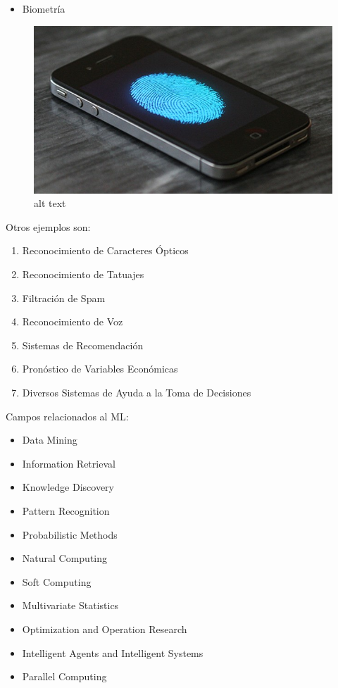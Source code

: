 \documentclass[11pt]{article}
\makeatletter
\def\maxwidth{\ifdim\Gin@nat@width>\linewidth\linewidth
    \else\Gin@nat@width\fi}
\let\Oldincludegraphics\includegraphics
\renewcommand{\includegraphics}[1]{\Oldincludegraphics[width=.8\maxwidth]{#1}}
\providecommand{\tightlist}{%
      \setlength{\itemsep}{0pt}\setlength{\parskip}{0pt}}
\makeatother
\begin{document}
    \begin{itemize}
\tightlist
\item
  Biometría
\end{itemize}

    \begin{figure}[htbp]
\centering
\includegraphics{./Images/iphone-fingerprint.jpeg}
\caption{alt text}
\end{figure}

    Otros ejemplos son:

\begin{enumerate}
\def\labelenumi{\arabic{enumi}.}
\tightlist
\item
  Reconocimiento de Caracteres Ópticos
\item
  Reconocimiento de Tatuajes
\item
  Filtración de Spam
\item
  Reconocimiento de Voz
\item
  Sistemas de Recomendación
\item
  Pronóstico de Variables Económicas
\item
  Diversos Sistemas de Ayuda a la Toma de Decisiones
\end{enumerate}

    Campos relacionados al ML:

\begin{itemize}
\tightlist
\item
  Data Mining
\item
  Information Retrieval
\item
  Knowledge Discovery
\item
  Pattern Recognition
\item
  Probabilistic Methods
\item
  Natural Computing
\item
  Soft Computing
\item
  Multivariate Statistics
\item
  Optimization and Operation Research
\item
  Intelligent Agents and Intelligent Systems
\item
  Parallel Computing
\end{itemize}
\end{document}
